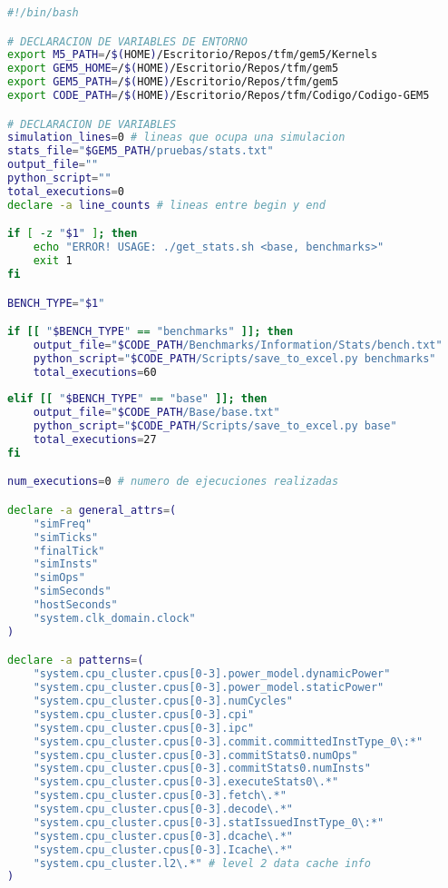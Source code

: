 \begin{lstlisting}[language=bash,caption={Programa de filtrado de estadísticas de Gem5},label=lst:getStats, showstringspaces=false,frame=single]
#!/bin/bash

# DECLARACION DE VARIABLES DE ENTORNO
export M5_PATH=/$(HOME)/Escritorio/Repos/tfm/gem5/Kernels
export GEM5_HOME=/$(HOME)/Escritorio/Repos/tfm/gem5
export GEM5_PATH=/$(HOME)/Escritorio/Repos/tfm/gem5
export CODE_PATH=/$(HOME)/Escritorio/Repos/tfm/Codigo/Codigo-GEM5

# DECLARACION DE VARIABLES
simulation_lines=0 # lineas que ocupa una simulacion
stats_file="$GEM5_PATH/pruebas/stats.txt"
output_file=""
python_script=""
total_executions=0
declare -a line_counts # lineas entre begin y end

if [ -z "$1" ]; then
    echo "ERROR! USAGE: ./get_stats.sh <base, benchmarks>"
    exit 1
fi

BENCH_TYPE="$1"

if [[ "$BENCH_TYPE" == "benchmarks" ]]; then
    output_file="$CODE_PATH/Benchmarks/Information/Stats/bench.txt"
    python_script="$CODE_PATH/Scripts/save_to_excel.py benchmarks"
    total_executions=60
    
elif [[ "$BENCH_TYPE" == "base" ]]; then
    output_file="$CODE_PATH/Base/base.txt"
    python_script="$CODE_PATH/Scripts/save_to_excel.py base"
    total_executions=27
fi

num_executions=0 # numero de ejecuciones realizadas

declare -a general_attrs=(
    "simFreq" 
    "simTicks" 
    "finalTick" 
    "simInsts" 
    "simOps" 
    "simSeconds"
    "hostSeconds"
    "system.clk_domain.clock"
)

declare -a patterns=(
    "system.cpu_cluster.cpus[0-3].power_model.dynamicPower"
    "system.cpu_cluster.cpus[0-3].power_model.staticPower"
    "system.cpu_cluster.cpus[0-3].numCycles"
    "system.cpu_cluster.cpus[0-3].cpi"
    "system.cpu_cluster.cpus[0-3].ipc"
    "system.cpu_cluster.cpus[0-3].commit.committedInstType_0\:*"
    "system.cpu_cluster.cpus[0-3].commitStats0.numOps"
    "system.cpu_cluster.cpus[0-3].commitStats0.numInsts"
    "system.cpu_cluster.cpus[0-3].executeStats0\.*"
    "system.cpu_cluster.cpus[0-3].fetch\.*"
    "system.cpu_cluster.cpus[0-3].decode\.*"
    "system.cpu_cluster.cpus[0-3].statIssuedInstType_0\:*"
    "system.cpu_cluster.cpus[0-3].dcache\.*"
    "system.cpu_cluster.cpus[0-3].Icache\.*"
    "system.cpu_cluster.l2\.*" # level 2 data cache info
)


\end{lstlisting}
